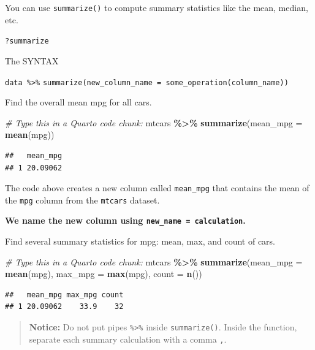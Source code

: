 \documentclass[
]{article}
\newenvironment{Shaded}{\begin{snugshade}}{\end{snugshade}}
\newcommand{\AttributeTok}[1]{\textcolor[rgb]{0.13,0.29,0.53}{#1}}
\newcommand{\CommentTok}[1]{\textcolor[rgb]{0.56,0.35,0.01}{\textit{#1}}}
\newcommand{\FunctionTok}[1]{\textcolor[rgb]{0.13,0.29,0.53}{\textbf{#1}}}
\newcommand{\NormalTok}[1]{#1}
\newcommand{\SpecialCharTok}[1]{\textcolor[rgb]{0.81,0.36,0.00}{\textbf{#1}}}
\begin{document}
You can use \texttt{summarize()} to compute summary statistics like the
mean, median, etc.

\texttt{?summarize}

The SYNTAX

\texttt{data\ \%\textgreater{}\%}
\texttt{summarize(new\_column\_name\ =\ some\_operation(column\_name))}

Find the overall mean mpg for all cars.

\begin{Shaded}
\begin{Highlighting}[]
\CommentTok{\#  Type this in a Quarto code chunk:}
\NormalTok{mtcars }\SpecialCharTok{\%\textgreater{}\%} 
  \FunctionTok{summarize}\NormalTok{(}\AttributeTok{mean\_mpg =} \FunctionTok{mean}\NormalTok{(mpg))}
\end{Highlighting}
\end{Shaded}

\begin{verbatim}
##   mean_mpg
## 1 20.09062
\end{verbatim}

The code above creates a new column called \texttt{mean\_mpg} that
contains the mean of the \texttt{mpg} column from the \texttt{mtcars}
dataset.

\textbf{We name the new column using
\texttt{new\_name\ =\ calculation}.}

Find several summary statistics for mpg: mean, max, and count of cars.

\begin{Shaded}
\begin{Highlighting}[]
\CommentTok{\#  Type this in a Quarto code chunk:}
\NormalTok{mtcars }\SpecialCharTok{\%\textgreater{}\%} 
  \FunctionTok{summarize}\NormalTok{(}\AttributeTok{mean\_mpg =} \FunctionTok{mean}\NormalTok{(mpg),}
            \AttributeTok{max\_mpg =} \FunctionTok{max}\NormalTok{(mpg),}
            \AttributeTok{count =} \FunctionTok{n}\NormalTok{())}
\end{Highlighting}
\end{Shaded}

\begin{verbatim}
##   mean_mpg max_mpg count
## 1 20.09062    33.9    32
\end{verbatim}

\begin{quote}
\textbf{Notice:} Do not put pipes \texttt{\%\textgreater{}\%} inside
\texttt{summarize()}. Inside the function, separate each summary
calculation with a comma \texttt{,}.
\end{quote}
\end{document}
